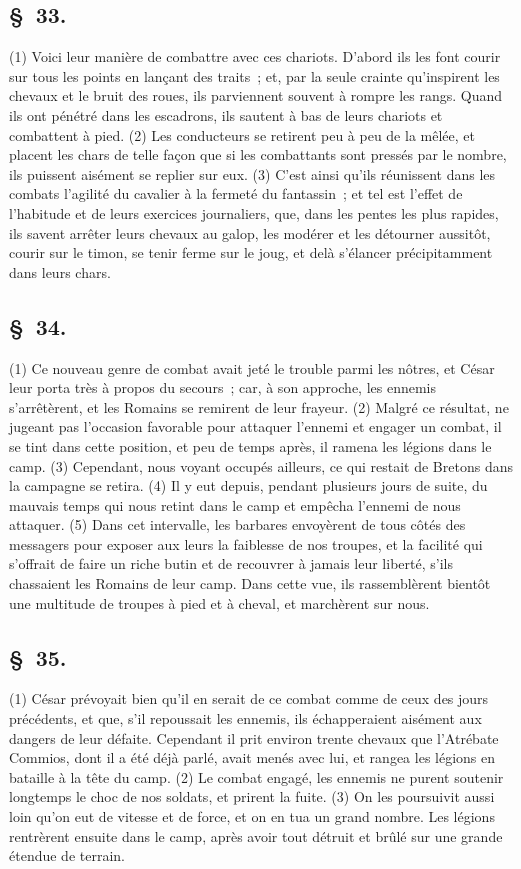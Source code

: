 \documentclass[french,twoside]{book} %
\begin{document}
\subsection[{§ 33.}]{ \textsc{§ 33.} }
\noindent (1) Voici leur manière de combattre avec ces chariots. D'abord ils les font courir sur tous les points en lançant des traits ; et, par la seule crainte qu’inspirent les chevaux et le bruit des roues, ils parviennent souvent à rompre les rangs. Quand ils ont pénétré dans les escadrons, ils sautent à bas de leurs chariots et combattent à pied. (2) Les conducteurs se retirent peu à peu de la mêlée, et placent les chars de telle façon que si les combattants sont pressés par le nombre, ils puissent aisément se replier sur eux. (3) C'est ainsi qu’ils réunissent dans les combats l’agilité du cavalier à la fermeté du fantassin ; et tel est l’effet de l’habitude et de leurs exercices journaliers, que, dans les pentes les plus rapides, ils savent arrêter leurs chevaux au galop, les modérer et les détourner aussitôt, courir sur le timon, se tenir ferme sur le joug, et delà s’élancer précipitamment dans leurs chars.
\subsection[{§ 34.}]{ \textsc{§ 34.} }
\noindent (1) Ce nouveau genre de combat avait jeté le trouble parmi les nôtres, et César leur porta très à propos du secours ; car, à son approche, les ennemis s’arrêtèrent, et les Romains se remirent de leur frayeur. (2) Malgré ce résultat, ne jugeant pas l’occasion favorable pour attaquer l’ennemi et engager un combat, il se tint dans cette position, et peu de temps après, il ramena les légions dans le camp. (3) Cependant, nous voyant occupés ailleurs, ce qui restait de Bretons dans la campagne se retira. (4) Il y eut depuis, pendant plusieurs jours de suite, du mauvais temps qui nous retint dans le camp et empêcha l’ennemi de nous attaquer. (5) Dans cet intervalle, les barbares envoyèrent de tous côtés des messagers pour exposer aux leurs la faiblesse de nos troupes, et la facilité qui s’offrait de faire un riche butin et de recouvrer à jamais leur liberté, s’ils chassaient les Romains de leur camp. Dans cette vue, ils rassemblèrent bientôt une multitude de troupes à pied et à cheval, et marchèrent sur nous.
\subsection[{§ 35.}]{ \textsc{§ 35.} }
\noindent (1) César prévoyait bien qu’il en serait de ce combat comme de ceux des jours précédents, et que, s’il repoussait les ennemis, ils échapperaient aisément aux dangers de leur défaite. Cependant il prit environ trente chevaux que l’Atrébate Commios, dont il a été déjà parlé, avait menés avec lui, et rangea les légions en bataille à la tête du camp. (2) Le combat engagé, les ennemis ne purent soutenir longtemps le choc de nos soldats, et prirent la fuite. (3) On les poursuivit aussi loin qu’on eut de vitesse et de force, et on en tua un grand nombre. Les légions rentrèrent ensuite dans le camp, après avoir tout détruit et brûlé sur une grande étendue de terrain.
\end{document}
